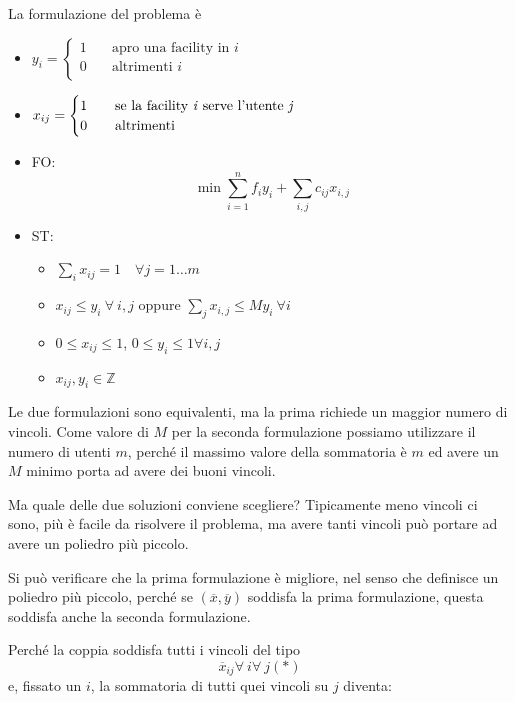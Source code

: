 La formulazione del problema è

\begin{itemize}
	\item $y_i = \begin{cases}
	1\quad&\text{apro una facility in }i \\
	0\quad&\text{altrimenti }i \\
	\end{cases}$
	\item $x_{ij} = \begin{cases}
	1\quad&\text{se la facility \textit{i} serve l'utente \textit{j}}\\
	0\quad&\text{altrimenti}
	\end{cases}$
	\item FO: $$
		\min \sum \limits_{i=1}^{n} f_i y_i + \sum\limits_{i,j} c_{ij}x_{i,j}
	$$
	\item ST: 
	\begin{itemize}
		\item $ \sum\limits_{i} x_{ij} = 1 \quad \forall j = 1 \ldots m$
		\item $x_{ij} \leq y_i \: \forall \: i,j$ oppure $\sum\limits_{j} x_{i,j} \leq M y_i  \:\forall i $
		\item $ 0 \leq x_{ij} \leq 1$, $ 0 \leq y_i \leq 1 \forall i,j$ 
		\item $ x_{ij}, y_i \in \mathbb{Z} $
	\end{itemize}
\end{itemize}

Le due formulazioni sono equivalenti, ma la prima richiede un maggior numero di vincoli. Come valore di $M$ per la seconda formulazione possiamo utilizzare il numero di utenti $m$, perché il massimo valore della sommatoria è $m$ ed avere un $M$ minimo porta ad avere dei buoni vincoli.

Ma quale delle due soluzioni conviene scegliere? Tipicamente meno vincoli ci sono, più è facile da risolvere il problema, ma avere tanti vincoli può portare ad avere un poliedro più piccolo.

Si può verificare che la prima formulazione è migliore, nel senso che definisce un poliedro più piccolo, perché se $(\overline{x},\overline{y})$ soddisfa la prima formulazione, questa soddisfa anche la seconda formulazione. 

Perché la coppia soddisfa tutti i vincoli del tipo
$$
\overline{x}_{ij} \forall\:i\forall\:j (*)
$$
e, fissato un $i$, la sommatoria di tutti quei vincoli su $j$ diventa:

